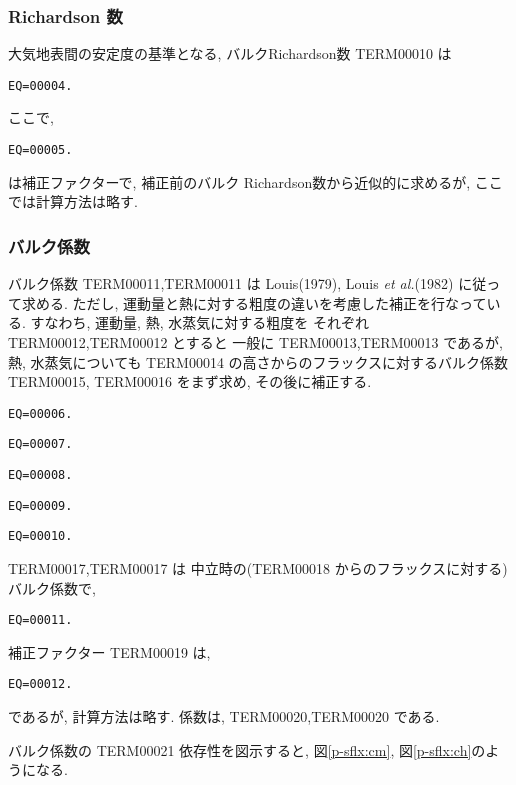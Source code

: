\subsubsection{Richardson 数}

大気地表間の安定度の基準となる,
バルクRichardson数 TERM00010 は
%
\begin{verbatim}
EQ=00004.
\end{verbatim}
ここで, 
\begin{verbatim}
EQ=00005.
\end{verbatim}
は補正ファクターで, 補正前のバルク Richardson数から近似的に求めるが, 
ここでは計算方法は略す. 

\subsubsection{バルク係数}

バルク係数 TERM00011,TERM00011 は
Louis(1979), Louis {\em et al.}(1982) に従って求める. 
ただし, 運動量と熱に対する粗度の違いを考慮した補正を行なっている. 
すなわち, 運動量, 熱, 水蒸気に対する粗度を
それぞれ TERM00012,TERM00012 とすると
一般に TERM00013,TERM00013 であるが, 熱, 水蒸気についても
TERM00014 の高さからのフラックスに対するバルク係数
TERM00015, TERM00016 をまず求め, その後に補正する. 
%
\begin{verbatim}
EQ=00006.
\end{verbatim}
%
\begin{verbatim}
EQ=00007.
\end{verbatim}
\begin{verbatim}
EQ=00008.
\end{verbatim}
%
\begin{verbatim}
EQ=00009.
\end{verbatim}
\begin{verbatim}
EQ=00010.
\end{verbatim}

TERM00017,TERM00017 は
中立時の(TERM00018 からのフラックスに対する)バルク係数で,
%
\begin{verbatim}
EQ=00011.
\end{verbatim}

補正ファクター TERM00019 は, 
\begin{verbatim}
EQ=00012.
\end{verbatim}
であるが, 計算方法は略す. 
係数は, TERM00020,TERM00020 である. 

バルク係数の TERM00021 依存性を図示すると,
図\ref{p-sflx:cm}, 図\ref{p-sflx:ch}のようになる.


